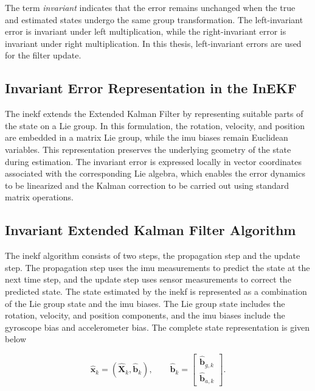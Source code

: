 \documentclass[report.tex]{subfiles}
\begin{document}
    The term \emph{invariant} indicates that the error remains unchanged when the true and estimated states undergo the same group transformation. The left-invariant error is invariant under left multiplication, while the right-invariant error is invariant under right multiplication. In this thesis, left-invariant errors are used for the filter update.

\subsection{Invariant Error Representation in the InEKF}
\label{subsec:background_inekf}

The \gls{inekf} extends the Extended Kalman Filter by representing suitable parts of the state on a Lie group. In this formulation, the rotation, velocity, and position are embedded in a matrix Lie group, while the \gls{imu} biases remain Euclidean variables. This representation preserves the underlying geometry of the state during estimation. The invariant error is expressed locally in vector coordinates associated with the corresponding Lie algebra, which enables the error dynamics to be linearized and the Kalman correction to be carried out using standard matrix operations.

\subsection{Invariant Extended Kalman Filter Algorithm}
\label{subsec:background_inekf_algorithm}

The \gls{inekf} algorithm consists of two steps, the propagation step and the update step. The propagation step uses the \gls{imu} measurements to predict the state at the next time step, and the update step uses sensor measurements to correct the predicted state. The state estimated by the \gls{inekf} is represented as a combination of the Lie group state and the \gls{imu} biases. The Lie group state includes the rotation, velocity, and position components, and the \gls{imu} biases include the gyroscope bias and accelerometer bias. The complete state representation is given below

\begin{equation}
    \hat{\boldsymbol{x}}_{k}
    =
    \left(
        \hat{\boldsymbol{X}}_{k},
        \hat{\boldsymbol{b}}_{k}
    \right),
    \qquad
    \hat{\boldsymbol{b}}_{k}
    =
    \begin{bmatrix}
        \hat{\boldsymbol{b}}_{g,k} \\
        \hat{\boldsymbol{b}}_{a,k}
    \end{bmatrix}.
    \label{eq:inekfCompleteStateBackground}
\end{equation}
\end{document}
